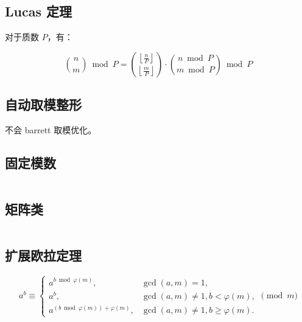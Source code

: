 \inputminted[mathescape]{cpp}{icpc/math/gcd/fast_gcd.cpp}

\subsection{Lucas 定理}

对于质数 $P$，有：

\[
\binom{n}{m}\bmod P =
\binom{\left\lfloor\frac{n}{P}\right\rfloor}{\left\lfloor\frac{m}{P}\right\rfloor}
\cdot \binom{n\bmod P}{m\bmod P}\bmod P
\]

\subsection{自动取模整形}

不会 barrett 取模优化。

\subsection{固定模数}

\inputminted{cpp}{icpc/math/modint/static_modint.cpp}

\subsection{矩阵类}

\inputminted{cpp}{icpc/math/matrix/matrix.cpp}

\subsection{扩展欧拉定理}

\[
    a^b \equiv \begin{cases}
        a^{b \bmod \varphi\left(m\right)},                &\gcd\left(a,m\right) =  1,                   \\
        a^b,                                   &\gcd\left(a,m\right)\ne 1, b <   \varphi\left(m\right), \\
        a^{\left(b \bmod \varphi\left(m\right)\right) + \varphi\left(m\right)}, &\gcd\left(a,m\right)\ne 1, b \ge \varphi\left(m\right).
      \end{cases} \pmod m
\]